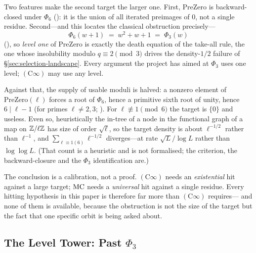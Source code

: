 \smallskip\noindent
Two features make the second target the larger one.  First,
$\mathrm{PreZero}$ is backward-closed under $\Phi_6$
(): it
is the union of all iterated preimages of $0$, not a single residue.
Second---and this locates the classical obstruction precisely---%
\[
  \Phi_6(w+1) \;=\; w^2 + w + 1 \;=\; \Phi_3(w)
\]
(), so \emph{level
one} of $\mathrm{PreZero}$ is exactly the death equation of the take-all
rule, the one whose insolubility modulo $q \equiv 2 \pmod 3$ drives the
density-$1/2$ failure of \S\ref{sec:selection-landscape}.  Every argument
the project has aimed at $\Phi_3$ uses one level; $(\mathrm{C}\infty)$ may
use any level.

Against that, the supply of usable moduli is halved: a nonzero element of
$\mathrm{PreZero}(\ell)$ forces a root of $\Phi_6$, hence a primitive
sixth root of unity, hence $6 \mid \ell-1$ (for primes $\ell \ne 2, 3$;
).
For $\ell \not\equiv 1 \pmod 6$ the target is $\{0\}$ and useless.  Even
so, heuristically the in-tree of a node in the functional graph of a map
on $\mathbb{Z}/\ell\mathbb{Z}$ has size of order $\sqrt{\ell}$, so the target density is
about $\ell^{-1/2}$ rather than $\ell^{-1}$, and
$\sum_{\ell \equiv 1 (6)} \ell^{-1/2}$ diverges---at rate
$\sqrt L/\log L$ rather than $\log\log L$.  (That count is a heuristic and
is not formalised; the criterion, the backward-closure and the $\Phi_3$
identification are.)

The conclusion is a calibration, not a proof.  $(\mathrm{C}\infty)$ needs
an \emph{existential} hit against a large target; $\mathrm{MC}$ needs a
\emph{universal} hit against a single residue.  Every hitting hypothesis
in this paper is therefore far more than $(\mathrm{C}\infty)$ requires---%
and none of them is available, because the obstruction is not the size of
the target but the fact that one specific orbit is being asked about.

\subsection{The Level Tower: Past $\Phi_3$}
\label{sec:level-tower}

